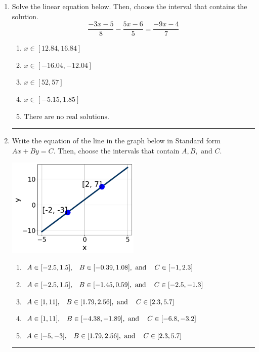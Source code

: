 \documentclass[14pt]{extbook}
\newcommand{\litem}[1]{\item#1\hspace*{-1cm}\rule{\textwidth}{0.4pt}}
\begin{document}
\begin{enumerate}
{\begin{enumerate}[label=\Alph*.]
\end{enumerate} }
\litem{
Solve the linear equation below. Then, choose the interval that contains the solution.\[ \frac{-3x -5}{8} - \frac{5x -6}{5} = \frac{-9x -4}{7} \]\begin{enumerate}[label=\Alph*.]
\item \( x \in [12.84, 16.84] \)
\item \( x \in [-16.04, -12.04] \)
\item \( x \in [52, 57] \)
\item \( x \in [-5.15, 1.85] \)
\item \( \text{There are no real solutions.} \)

\end{enumerate} }
\litem{
Write the equation of the line in the graph below in Standard form $Ax+By=C$. Then, choose the intervals that contain $A, B, \text{ and } C$.
\begin{center}
    \includegraphics[width=0.5\textwidth]{../Figures/linearGraphToStandardCopyC.png}
\end{center}
\begin{enumerate}[label=\Alph*.]
\item \( A \in [-2.5, 1.5], \hspace{3mm} B \in [-0.39, 1.08], \text{ and } \hspace{3mm} C \in [-1, 2.3] \)
\item \( A \in [-2.5, 1.5], \hspace{3mm} B \in [-1.45, 0.59], \text{ and } \hspace{3mm} C \in [-2.5, -1.3] \)
\item \( A \in [1, 11], \hspace{3mm} B \in [1.79, 2.56], \text{ and } \hspace{3mm} C \in [2.3, 5.7] \)
\item \( A \in [1, 11], \hspace{3mm} B \in [-4.38, -1.89], \text{ and } \hspace{3mm} C \in [-6.8, -3.2] \)
\item \( A \in [-5, -3], \hspace{3mm} B \in [1.79, 2.56], \text{ and } \hspace{3mm} C \in [2.3, 5.7] \)

\end{enumerate} }
\end{enumerate}
\end{document}
